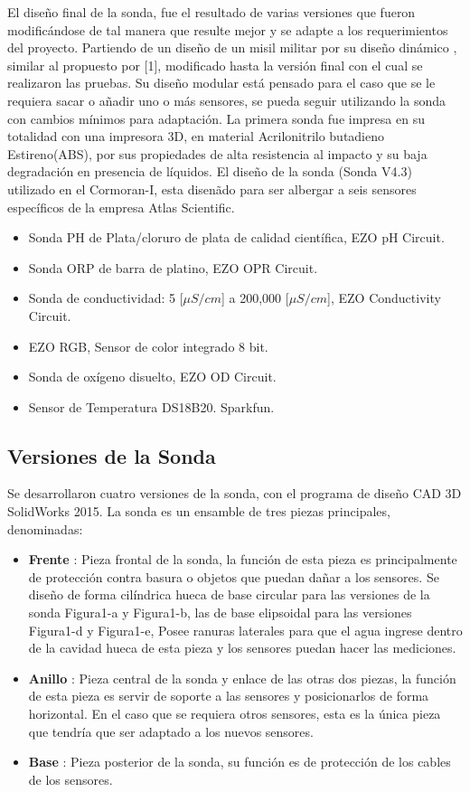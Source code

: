 \begin{appendices}
El diseño final de la sonda, fue el resultado de varias versiones que fueron modificándose de tal manera que resulte mejor y se adapte a los requerimientos del proyecto.
Partiendo de un diseño de un misil militar por su dise\~no din\'amico , similar al propuesto por [1], modificado hasta la versión final con el cual se realizaron las pruebas. Su diseño modular est\'a pensado para el caso que se le requiera sacar o añadir uno o m\'as sensores, se pueda seguir utilizando la sonda con cambios mínimos para adaptación.
La primera sonda fue impresa en su totalidad con una impresora 3D, en material Acrilonitrilo butadieno Estireno(ABS), por sus propiedades de alta resistencia al impacto y su baja degradación en presencia de líquidos. 
El diseño de la sonda (Sonda V4.3) utilizado en el Cormoran-I, esta disen\~ado para ser albergar a seis sensores específicos de la empresa Atlas Scientific.

\begin{itemize}
    \item Sonda PH de Plata/cloruro de plata de calidad científica, EZO pH Circuit.
    \item Sonda ORP de barra de platino, EZO OPR Circuit.
    \item Sonda de conductividad: 5 [\(\mu S/cm\)] a 200,000 [\(\mu S/cm\)], EZO Conductivity Circuit.
    \item EZO RGB, Sensor de color integrado 8 bit.
    \item Sonda de oxígeno disuelto, EZO OD Circuit.
    \item Sensor de Temperatura DS18B20. Sparkfun.
\end{itemize}
    
\subsection{Versiones de la Sonda }
Se desarrollaron cuatro versiones de la sonda, con el programa de diseño CAD 3D SolidWorks 2015. La sonda es un ensamble de tres piezas principales, denominadas:

\begin{itemize}
\item \textbf{Frente} : Pieza frontal de la sonda, la función de esta pieza es principalmente de protección contra basura o objetos que puedan dañar a los sensores. Se dise\~no de forma cil\'indrica hueca de base circular para las versiones de la sonda Figura1-a y Figura1-b, las de base elipsoidal para las versiones Figura1-d y Figura1-e, Posee ranuras laterales para que el agua ingrese dentro de la cavidad hueca de esta pieza y los sensores puedan hacer las mediciones.  
\item \textbf{Anillo} : Pieza central de la sonda y enlace de las otras dos piezas, la función de esta pieza es servir de soporte a las sensores y posicionarlos de forma horizontal. En el caso que se requiera otros sensores, esta es la única pieza que tendría que ser adaptado a los nuevos sensores.
\item \textbf{Base}  : Pieza posterior de la sonda, su función es de protección de los cables de los sensores. 
\end{itemize}


\end{appendices}

